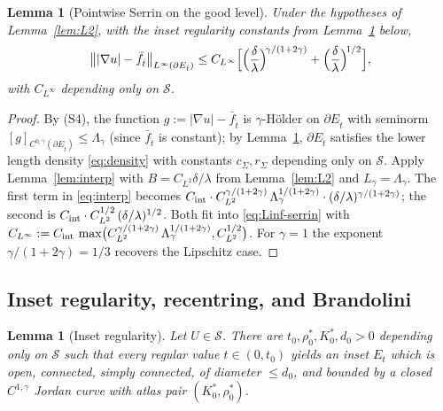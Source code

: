 \documentclass[11pt]{amsart}
\newtheorem{lemma}[theorem]{Lemma}
\newcommand{\Et}{E_{\hat t}}
\newcommand{\Sclass}{\mathcal S}
\begin{document}
\begin{lemma}[Pointwise Serrin on the good level]\label{lem:Linf}
Under the hypotheses of Lemma~\ref{lem:L2}, with the inset
regularity constants from Lemma~\ref{lem:inset-regularity} below,
\begin{equation}\label{eq:Linf-serrin}
   \bigl\||\nabla u|-\bar f_{\hat t}\bigr\|_{L^\infty(\partial \Et)}
      \le
   C_{L^\infty}\Bigl[
      \Bigl(\frac{\delta}{\lambda}\Bigr)^{\!\gamma/(1+2\gamma)}
      +\Bigl(\frac{\delta}{\lambda}\Bigr)^{\!1/2}
   \Bigr],
\end{equation}
with $C_{L^\infty}$ depending only on $\Sclass$.
\end{lemma}

\begin{proof}
By (S4), the function $g:=|\nabla u|-\bar f_{\hat t}$ is
$\gamma$-Hölder on $\partial\Et$ with seminorm
$[g]_{C^{0,\gamma}(\partial\Et)}\le\Lambda_\gamma$ (since
$\bar f_{\hat t}$ is constant); by
Lemma~\ref{lem:inset-regularity}, $\partial\Et$ satisfies the
lower length density \eqref{eq:density} with constants
$c_\Sigma,r_\Sigma$ depending only on $\Sclass$.  Apply
Lemma~\ref{lem:interp} with $B=C_{L^2}\delta/\lambda$ from
Lemma~\ref{lem:L2} and $L_\gamma=\Lambda_\gamma$.  The first term
in \eqref{eq:interp} becomes
$C_{\rm int}\cdot C_{L^2}^{\gamma/(1+2\gamma)}\,
\Lambda_\gamma^{1/(1+2\gamma)}\cdot
(\delta/\lambda)^{\gamma/(1+2\gamma)}$;
the second is $C_{\rm int}\cdot C_{L^2}^{1/2}\,(\delta/\lambda)^{1/2}$.
Both fit into \eqref{eq:Linf-serrin} with
$C_{L^\infty}:=C_{\rm int}\,\max\bigl(C_{L^2}^{\gamma/(1+2\gamma)}\,
\Lambda_\gamma^{1/(1+2\gamma)},C_{L^2}^{1/2}\bigr)$.  For
$\gamma=1$ the exponent $\gamma/(1+2\gamma)=1/3$ recovers the
Lipschitz case.
\end{proof}

\subsection{Inset regularity, recentring, and Brandolini}

\begin{lemma}[Inset regularity]\label{lem:inset-regularity}
Let $U\in\Sclass$.  There are $t_0,\rho_0^*,K_0^*,d_0>0$ depending
only on $\Sclass$ such that every regular value $t\in(0,t_0)$
yields an inset $E_t$ which is open, connected, simply connected,
of diameter $\le d_0$, and bounded by a closed $C^{1,\gamma}$ Jordan
curve with atlas pair $(K_0^*,\rho_0^*)$.
\end{lemma}
\end{document}
